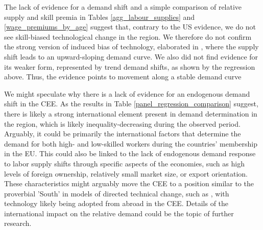 \documentclass[11pt]{article}
\begin{document}

The lack of evidence for a demand shift and a simple comparison of relative supply and skill premia in Tables \ref{agg_labour_supplies} and \ref{wage_premiums_by_age} suggest that, contrary to the US evidence, we do not see skill-biased technological change in the region. We therefore do not confirm the strong version of induced bias of technology, elaborated in \cite{acemoglu2002directed}, where the supply shift leads to an upward-sloping demand curve. We also did not find evidence for its weaker form, represented by trend demand shifts, as shown by the regression above. Thus, the evidence points to movement along a stable demand curve

We might speculate why there is a lack of evidence for an endogenous demand shift in the CEE. As the results in Table \ref{panel_regression_comparison} suggest, there is likely a strong international element present in demand determination in the region, which is likely inequality-decreasing during the observed period. Arguably, it could be primarily the international factors that determine the demand for both high- and low-skilled workers during the countries' membership in the EU. This could also be linked to the lack of endogenous demand response to labor supply shifts through specific aspects of the economies, such as high levels of foreign ownership, relatively small market size, or export orientation. These characteristics might arguably move the CEE to a position similar to the proverbial 'South' in models of directed technical change, such as \cite{acemoglu2002directed}, with technology likely being adopted from abroad in the CEE. Details of the international impact on the relative demand could be the topic of further research.



\end{document}
